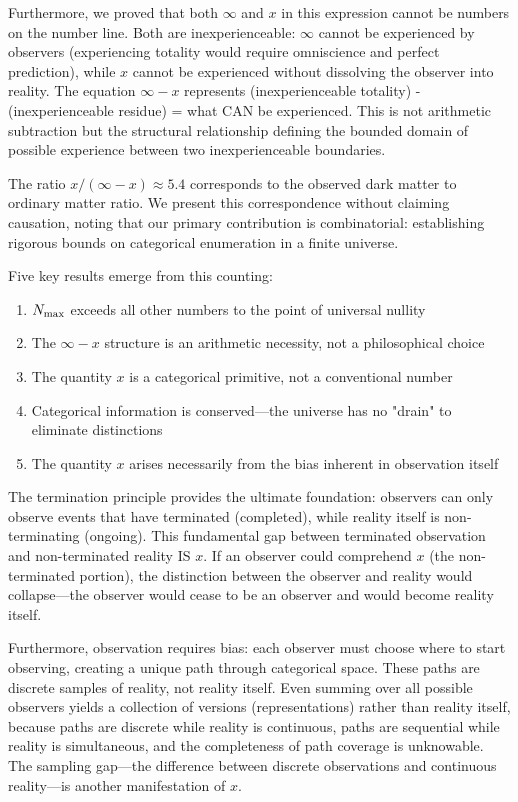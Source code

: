 Furthermore, we proved that both $\infty$ and $x$ in this expression cannot be numbers on the number line. Both are inexperienceable: $\infty$ cannot be experienced by observers (experiencing totality would require omniscience and perfect prediction), while $x$ cannot be experienced without dissolving the observer into reality. The equation $\infty - x$ represents (inexperienceable totality) - (inexperienceable residue) = what CAN be experienced. This is not arithmetic subtraction but the structural relationship defining the bounded domain of possible experience between two inexperienceable boundaries.

The ratio $x/(\infty - x) \approx 5.4$ corresponds to the observed dark matter to ordinary matter ratio. We present this correspondence without claiming causation, noting that our primary contribution is combinatorial: establishing rigorous bounds on categorical enumeration in a finite universe.

Five key results emerge from this counting:
\begin{enumerate}
    \item $N_{\text{max}}$ exceeds all other numbers to the point of universal nullity
    \item The $\infty - x$ structure is an arithmetic necessity, not a philosophical choice
    \item The quantity $x$ is a categorical primitive, not a conventional number
    \item Categorical information is conserved—the universe has no "drain" to eliminate distinctions
    \item The quantity $x$ arises necessarily from the bias inherent in observation itself
\end{enumerate}

The termination principle provides the ultimate foundation: observers can only observe events that have terminated (completed), while reality itself is non-terminating (ongoing). This fundamental gap between terminated observation and non-terminated reality IS $x$. If an observer could comprehend $x$ (the non-terminated portion), the distinction between the observer and reality would collapse—the observer would cease to be an observer and would become reality itself.

Furthermore, observation requires bias: each observer must choose where to start observing, creating a unique path through categorical space. These paths are discrete samples of reality, not reality itself. Even summing over all possible observers yields a collection of versions (representations) rather than reality itself, because paths are discrete while reality is continuous, paths are sequential while reality is simultaneous, and the completeness of path coverage is unknowable. The sampling gap—the difference between discrete observations and continuous reality—is another manifestation of $x$.

